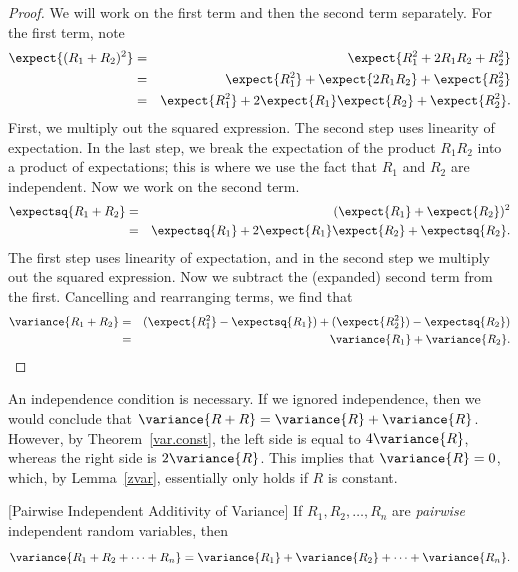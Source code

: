 \begin{proof}
We will work on the first term and then the second term separately.
For the first term, note\begin{eqnarray*}
\expect{(R_1+R_2)^2}
& = &   \expect{R_1^2 + 2 R_1 R_2 + R_2^2} \\
& = &   \expect{R_1^2} + \expect{2 R_1 R_2} + \expect{R_2^2} \\
& = &   \expect{R_1^2} + 2 \expect{R_1} \expect{R_2} + \expect{R_2^2}.
\end{eqnarray*}
First, we multiply out the squared expression.  The second step uses
linearity of expectation.  In the last step, we break the
expectation of the product $R_1 R_2$ into a product of expectations;
this is where we use the fact that $R_1$ and $R_2$ are independent.
Now we work on the second term.
\begin{eqnarray*}
\expectsq{R_1+R_2} & = & (\expect{R_1} + \expect{R_2})^2 \\
& = & \expectsq{R_1} + 2 \expect{R_1} \expect{R_2} + \expectsq{R_2}.
\end{eqnarray*}
The first step uses linearity of expectation, and in the second step
we multiply out the squared expression.  Now we subtract the
(expanded) second term from the first. Cancelling and rearranging
terms, we find that
\begin{eqnarray*}
\variance{R_1 + R_2} & = &   (\expect{R_1^2} - \expectsq{R_1}) +
(\expect{R_2^2}) - \expectsq{R_2}) \\
& = &   \variance{R_1} + \variance{R_2}.
\end{eqnarray*}

\end{proof}

An independence condition is necessary.  If we ignored independence, then
we would conclude that $\variance{R + R} = \variance{R} + \variance{R}$.
However, by Theorem~\ref{var.const}, the left side is equal to $4
\variance{R}$, whereas the right side is $2 \variance{R}$.  This implies
that $\variance{R}=0$, which, by Lemma~\ref{zvar}, essentially only holds
if $R$ is constant.
\fi


\begin{theorem}\label{th:varsum}[Pairwise Independent Additivity of Variance]
If $R_1, R_2, \dots, R_n$ are \emph{pairwise} independent random
variables, then
\begin{equation}\label{vsum}
\variance{R_1 + R_2 + \cdots + R_n} = \variance{R_1} + \variance{R_2} +
  \cdots + \variance{R_n}.
\end{equation}
\end{theorem}

